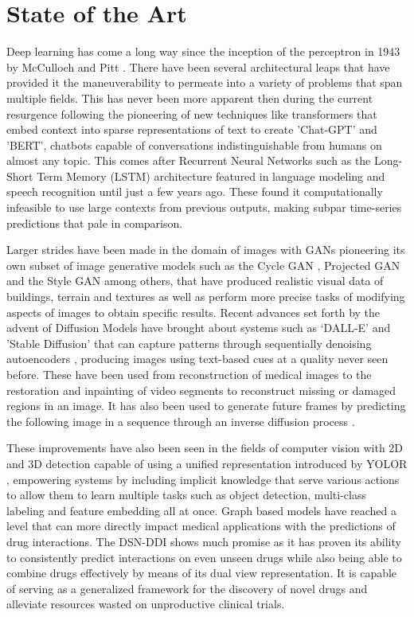 \documentclass{Configuration_Files/PoliMi3i_thesis}
\begin{document}
\section{State of the Art}
Deep learning has come a long way since the inception of the perceptron in 
1943 by McCulloch and Pitt \cite{WaM90}. There have been several architectural leaps 
that have provided it the maneuverability to permeate into a variety of problems that
span multiple fields. This has never been more apparent then during the current resurgence following 
the pioneering of new techniques like transformers \cite{AsV17} that embed context into sparse 
representations of text to create 'Chat-GPT' and 'BERT', chatbots capable of conversations indistinguishable 
from humans on almost any topic. This comes after Recurrent Neural Networks such as the Long-Short 
Term Memory (LSTM) architecture \cite{SeH97} featured in language modeling and speech recognition 
until just a few years ago. These found it computationally infeasible to use large contexts from previous 
outputs, making subpar time-series predictions \cite{AlZ19} that pale in comparison.

Larger strides have been made in the domain of images with GANs pioneering its own subset of 
image generative models such as the Cycle GAN \cite{JuZ17}, Projected GAN \cite{AxS21} and 
the Style GAN \cite{TeK19} among others, that have produced realistic visual data of buildings, terrain 
and textures \cite{ChB17,TiT11} as well as perform more precise tasks of modifying aspects of images to 
obtain specific results. Recent advances set forth by the advent of Diffusion Models have brought about 
systems such as ‘DALL-E’ and 'Stable Diffusion' that can capture patterns through sequentially denoising 
autoencoders \cite{RoR22}, producing images using text-based cues at a quality never seen before. These 
have been used from reconstruction of medical images to the restoration and inpainting of video segments to 
reconstruct missing or damaged regions in an image. It has also been used to generate future frames by predicting 
the following image in a sequence through an inverse diffusion process \cite{LiY22}. 

These improvements have also been seen in the fields of computer vision with 2D and 3D detection capable of using a
unified representation introduced by YOLOR \cite{ChW21}, empowering systems by including implicit knowledge 
that serve various actions to allow them to learn multiple tasks such as object detection, multi-class labeling and 
feature embedding all at once. Graph based models have reached a level that can more directly impact medical 
applications with the predictions of drug interactions. The DSN-DDI \cite{ZiL23} shows much promise as it has 
proven its ability to consistently predict interactions on even unseen drugs while also being able to combine 
drugs effectively by means of its dual view representation. It is capable of serving as a generalized framework for 
the discovery of novel drugs and alleviate resources wasted on unproductive clinical trials.
\end{document}
